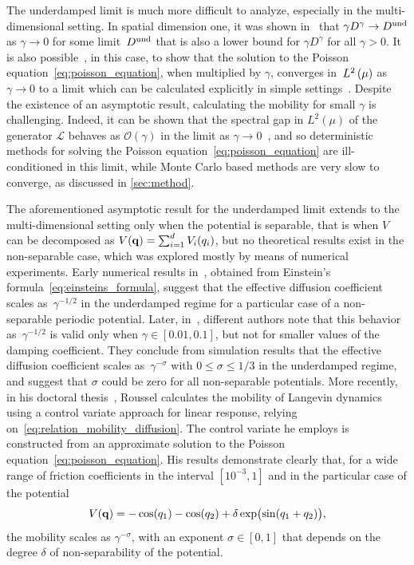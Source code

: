 \documentclass[11pt,a4paper]{article}
\begin{document}
The underdamped limit is much more difficult to analyze,
especially in the multi-dimensional setting.
In spatial dimension one, it was shown in~\cite{MR2394704} that $\gamma D^{\gamma} \to D^{\rm und}$ as $\gamma \to 0$ for some limit~$D^{\rm und}$
that is also a lower bound for $\gamma D^{\gamma}$ for all $\gamma > 0$.
It is also possible~\cite[Lemma~3.4]{MR2394704}, in this case,
to show that the solution to the Poisson equation~\eqref{eq:poisson_equation},
when multiplied by $\gamma$, converges in~$\lp{2}{\mu}$ as $\gamma \to 0$ to a limit
which can be calculated explicitly in simple settings~\cite{MR2427108}.
Despite the existence of an asymptotic result,
calculating the mobility for small $\gamma$ is challenging.
Indeed, it can be shown that the spectral gap in $L^2(\mu)$ of the generator $\mathcal L$ behaves as $\mathcal O(\gamma)$ in the limit as $\gamma \to 0$~\cite{MR2394704,MR3106879,MR3522857,roussel2018spectral},
and so deterministic methods for solving the Poisson equation~\eqref{eq:poisson_equation} are ill-conditioned in this limit,
while Monte Carlo based methods are very slow to converge,
as discussed in \cref{sec:method}.

The aforementioned asymptotic result for the underdamped limit extends to the multi-dimensional setting only when the potential is separable,
that is when $V$ can be decomposed as $V(\boldsymbol{\mathbf q}) = \sum_{i=1}^d V_i(q_i)$,
but no theoretical results exist in the non-separable case,
which was explored mostly by means of numerical experiments.
Early numerical results in~\cite{chen1996surface}, obtained from Einstein's formula~\eqref{eq:einsteins_formula},
suggest that the effective diffusion coefficient scales as~$\gamma^{-1/2}$ in the underdamped regime for a particular case of a non-separable periodic potential.
Later, in~\cite{Braun02},
different authors note that this behavior as~$\gamma^{-1/2}$ is valid only when $\gamma \in [0.01, 0.1]$,
but not for smaller values of the damping coefficient.
They conclude from simulation results that the effective diffusion coefficient scales as~$\gamma^{-\sigma}$ with $0 \leq \sigma \leq 1/3$ in the underdamped regime,
and suggest that $\sigma$ could be zero for all non-separable potentials.
More recently, in his doctoral thesis~\cite{roussel_thesis},
Roussel calculates the mobility of Langevin dynamics using a control variate approach for linear response,
relying on~\eqref{eq:relation_mobility_diffusion}.
The control variate he employs is constructed from an approximate solution to the Poisson equation~\eqref{eq:poisson_equation}.
His results demonstrate clearly that, for a wide range of friction coefficients in the interval $[10^{-3}, 1]$
and in the particular case of the potential
\begin{equation}
    \label{eq:potential_julien}
    V(\boldsymbol{\mathbf q}) = - \cos(q_1) - \cos(q_2) + \delta \exp \bigl(\sin(q_1 + q_2)\bigr),
\end{equation}
the mobility scales as $\gamma^{- \sigma}$,
with an exponent $\sigma \in [0, 1]$ that depends on the degree $\delta$ of non-separability of the potential.
\end{document}
